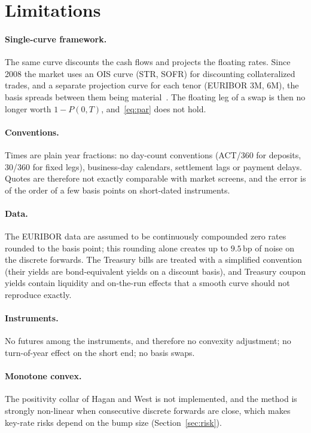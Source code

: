 \documentclass[11pt,a4paper]{article}
\theoremstyle{plain}
\theoremstyle{definition}
\newcommand{\bp}{\,\mathrm{bp}}
\begin{document}
\clearpage
\section{Limitations}
\label{sec:limits}

\paragraph{Single-curve framework.} The same curve discounts the cash flows and projects the floating rates. Since 2008 the market uses an OIS curve (\texteuro STR, SOFR) for discounting collateralized trades, and a separate projection curve for each tenor (EURIBOR 3M, 6M), the basis spreads between them being material~\cite{ametrano}. The floating leg of a swap is then no longer worth $1-P(0,T)$, and~\eqref{eq:par} does not hold.

\paragraph{Conventions.} Times are plain year fractions: no day-count conventions (ACT/360 for deposits, 30/360 for fixed legs), business-day calendars, settlement lags or payment delays. Quotes are therefore not exactly comparable with market screens, and the error is of the order of a few basis points on short-dated instruments.

\paragraph{Data.} The EURIBOR data are assumed to be continuously compounded zero rates rounded to the basis point; this rounding alone creates up to $9.5\bp$ of noise on the discrete forwards. The Treasury bills are treated with a simplified convention (their yields are bond-equivalent yields on a discount basis), and Treasury coupon yields contain liquidity and on-the-run effects that a smooth curve should not reproduce exactly.

\paragraph{Instruments.} No futures among the instruments, and therefore no convexity adjustment; no turn-of-year effect on the short end; no basis swaps.

\paragraph{Monotone convex.} The positivity collar of Hagan and West is not implemented, and the method is strongly non-linear when consecutive discrete forwards are close, which makes key-rate risks depend on the bump size (Section~\ref{sec:risk}).
\end{document}
